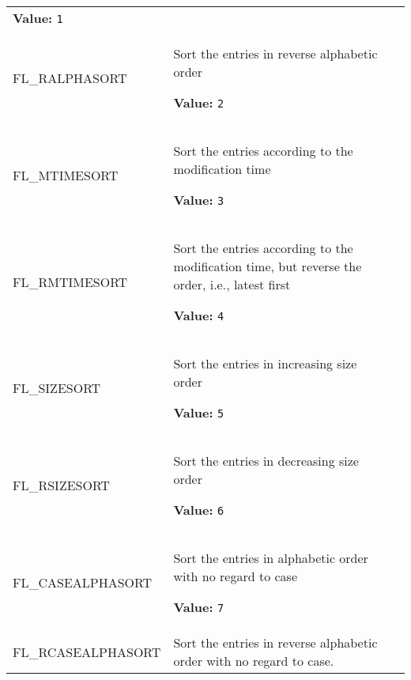 \begin{longtable}{|p{\varnamewidth}|p{\vardescrwidth}|l}
\textbf{Value:} 
{\tt 1}&\\
\cline{1-2}
\raggedright F\-L\-\_\-R\-A\-L\-P\-H\-A\-S\-O\-R\-T\- & \raggedright Sort the entries in reverse alphabetic order

\textbf{Value:} 
{\tt 2}&\\
\cline{1-2}
\raggedright F\-L\-\_\-M\-T\-I\-M\-E\-S\-O\-R\-T\- & \raggedright Sort the entries according to the modification time

\textbf{Value:} 
{\tt 3}&\\
\cline{1-2}
\raggedright F\-L\-\_\-R\-M\-T\-I\-M\-E\-S\-O\-R\-T\- & \raggedright Sort the entries according to the modification time, but reverse 
          the order, i.e., latest first

\textbf{Value:} 
{\tt 4}&\\
\cline{1-2}
\raggedright F\-L\-\_\-S\-I\-Z\-E\-S\-O\-R\-T\- & \raggedright Sort the entries in increasing size order

\textbf{Value:} 
{\tt 5}&\\
\cline{1-2}
\raggedright F\-L\-\_\-R\-S\-I\-Z\-E\-S\-O\-R\-T\- & \raggedright Sort the entries in decreasing size order

\textbf{Value:} 
{\tt 6}&\\
\cline{1-2}
\raggedright F\-L\-\_\-C\-A\-S\-E\-A\-L\-P\-H\-A\-S\-O\-R\-T\- & \raggedright Sort the entries in alphabetic order with no regard to case

\textbf{Value:} 
{\tt 7}&\\
\cline{1-2}
\raggedright F\-L\-\_\-R\-C\-A\-S\-E\-A\-L\-P\-H\-A\-S\-O\-R\-T\- & \raggedright Sort the entries in reverse alphabetic order with no regard to 
          case.


\end{longtable}
